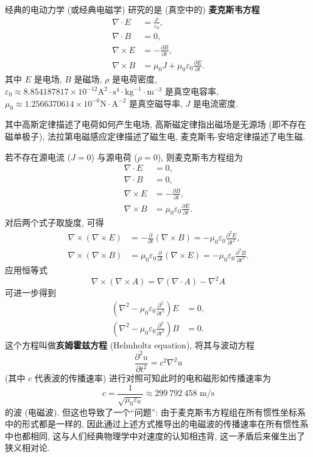 经典的电动力学 (或经典电磁学) 研究的是 (真空中的) {\bf 麦克斯韦方程}
\begin{align*}
    \nabla\cdot E&=\frac{\rho}{\varepsilon_0}, \tag{高斯定理}\\
    \nabla\cdot B&= 0, \tag{高斯磁定律}\\ 
    \nabla\times E&=-\frac{\partial B}{\partial t}, \tag{法拉第电磁感应定律}\\
    \nabla\times B&=\mu_0 J+\mu_0\varepsilon_0\frac{\partial E}{\partial t}. \tag{麦克斯韦-安培定律}
\end{align*}
其中 $ E $ 是电场, $ B $ 是磁场, $ \rho $ 是电荷密度, $ \varepsilon_0\approx 8.854187817\times 10^{-12}\text{A}^2\cdot\text{s}^4\cdot\text{kg}^{-1}\cdot\text{m}^{-3} $ 是真空电容率, $ \mu_0\approx 1.2566370614\times 10^{-6} \text{N}\cdot\text{A}^{-2} $ 是真空磁导率, $ J $ 是电流密度.

其中高斯定律描述了电荷如何产生电场, 高斯磁定律指出磁场是无源场 (即不存在磁单极子), 法拉第电磁感应定律描述了磁生电, 麦克斯韦-安培定律描述了电生磁.

若不存在源电流 ($J=0$) 与源电荷 ($\rho=0$), 则麦克斯韦方程组为
\begin{align*}
    \nabla\cdot E&=0,\\
    \nabla\cdot B&=0,\\ 
    \nabla\times E&=-\frac{\partial B}{\partial t},\\
    \nabla\times B&=\mu_0\varepsilon_0\frac{\partial E}{\partial t}.
\end{align*}
对后两个式子取旋度, 可得
\begin{align*}
    \nabla\times(\nabla\times E) &= -\frac{\partial}{\partial t}(\nabla\times B)=-\mu_0\varepsilon_0\frac{\partial^2 E}{\partial t^2},\\ 
    \nabla\times(\nabla\times B) &= \mu_0\varepsilon_0\frac{\partial}{\partial t}(\nabla\times E)=-\mu_0\varepsilon_0\frac{\partial^2 B}{\partial t^2}.
\end{align*}
应用恒等式
\[ \nabla\times(\nabla\times A)=\nabla(\nabla\cdot A)-\nabla^2 A \]
可进一步得到
\[ \begin{aligned}
    \left( \nabla^2-\mu_0\varepsilon_0\frac{\partial^2}{\partial t^2} \right)E &=0,\\ 
    \left( \nabla^2-\mu_0\varepsilon_0\frac{\partial^2}{\partial t^2} \right)B &=0.
\end{aligned} \]
这个方程叫做{\bf 亥姆霍兹方程} (Helmholtz equation), 将其与波动方程
\[ \frac{\partial^2 u}{\partial t^2}=c^2\nabla^2 u \]
(其中 $ c $ 代表波的传播速率) 进行对照可知此时的电和磁形如传播速率为
\[ c=\frac{1}{\sqrt{\mu_0\varepsilon_0}}\approx 299\ 792\ 458 \text{ m/s} \] 
的波 (电磁波). 但这也导致了一个``问题'': 由于麦克斯韦方程组在所有惯性坐标系中的形式都是一样的, 因此通过上述方式推导出的电磁波的传播速率在所有惯性系中也都相同, 这与人们经典物理学中对速度的认知相违背, 这一矛盾后来催生出了狭义相对论.

